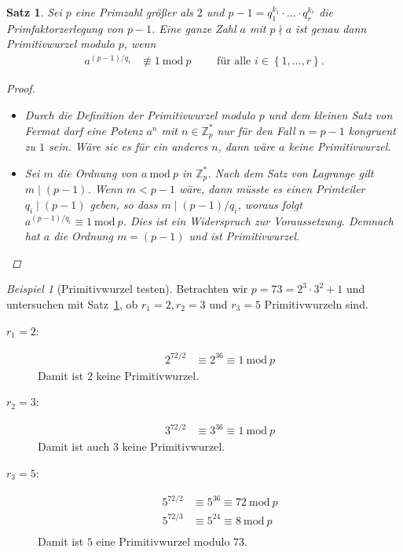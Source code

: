 \documentclass[
  a4paper,
  11pt,
]{scrartcl}
\theoremstyle{plain}
\newtheorem{satz}{Satz}
\theoremstyle{definition}
\theoremstyle{remark}
\newtheorem{beispiel}{Beispiel}
\newcommand{\Z}{\mathbb{Z}}
\newcommand{\Mod}[1]{\ \mathrm{mod}\ #1}
\begin{document}
\begin{satz}\label{satz:primitivwurzeltest}
  Sei $p$ eine Primzahl größer als $2$ und
  $p-1 = q_1^{k_1} \cdot \ldots \cdot q_r^{k_r}$ die Primfaktorzerlegung von
  $p-1$. Eine ganze Zahl $a$ mit $p \nmid a$ ist genau dann Primitivwurzel
  modulo $p$, wenn
  \begin{align*}
    a^{(p-1)/q_i} & \not\equiv 1 \Mod{p} \qquad \text{ für alle } i \in \left\{1, \ldots, r\right\}.
  \end{align*}

  \begin{proof}
    \begin{itemize}
      \item[„$\Rightarrow$“] Durch die Definition der Primitivwurzel modulo $p$
        und dem kleinen Satz von Fermat darf eine Potenz $a^n$ mit
        $n \in \Z_p^*$ nur für den Fall $n = p-1$ kongruent zu $1$ sein. Wäre
        sie es für ein anderes $n$, dann wäre $a$ keine Primitivwurzel.
      \item[„$\Leftarrow$“] Sei $m$ die Ordnung von $a \Mod{p}$ in $\Z_p^*$.
        Nach dem Satz von Lagrange gilt $m \mid (p-1)$. Wenn $m < p-1$ wäre,
        dann müsste es einen Primteiler $q_i \mid (p-1)$ geben, so dass
        $m \mid (p-1)/q_i$, woraus folgt $a^{(p-1)/q_i} \equiv 1 \Mod{p}$. Dies
        ist ein Widerspruch zur Voraussetzung. Demnach hat $a$ die Ordnung
        $m = (p-1)$ und ist Primitivwurzel.
    \end{itemize}
  \end{proof}
\end{satz}

\begin{beispiel}[Primitivwurzel testen]\label{bsp:primitivwurzel_testen}
  Betrachten wir $p = 73 = 2^3 \cdot 3^2 + 1$ und untersuchen mit
  Satz~\ref{satz:primitivwurzeltest}, ob $r_1 = 2, r_2 = 3$ und $r_3 = 5$
  Primitivwurzeln sind.

  \begin{description}
    \item[$r_1 = 2$:]
      \begin{align*}
        2^{72/2}
        & \equiv 2^{36} \equiv 1 \Mod{p}
      \end{align*}
      Damit ist $2$ keine Primitivwurzel.
    \item[$r_2 = 3$:]
      \begin{align*}
        3^{72/2}
        & \equiv 3^{36} \equiv 1 \Mod{p}
      \end{align*}
      Damit ist auch $3$ keine Primitivwurzel.
    \item[$r_3 = 5$:]
      \begin{align*}
        5^{72/2}
        & \equiv 5^{36} \equiv 72 \Mod{p}\\
        5^{72/3}
        & \equiv 5^{24} \equiv 8 \Mod{p}\\
      \end{align*}
      Damit ist $5$ eine Primitivwurzel modulo $73$.
  \end{description}
\end{beispiel}
\end{document}
